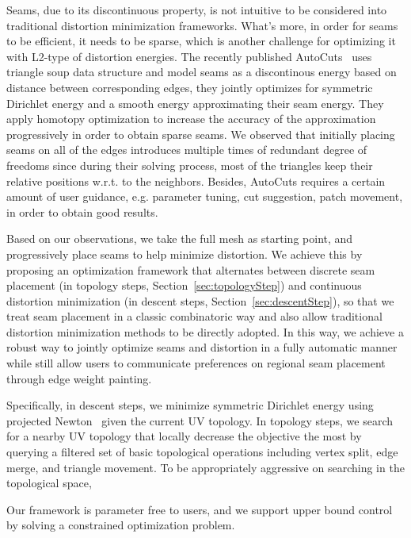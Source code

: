 Seams, due to its discontinuous property, is not intuitive to be considered into traditional distortion minimization frameworks. What's more, in order for seams to be efficient, it needs to be sparse, which is another challenge for optimizing it with L2-type of distortion energies. The recently published AutoCuts~\cite{Poranne2017Autocuts} uses triangle soup data structure and model seams as a discontinous energy based on distance between corresponding edges, they jointly optimizes for symmetric Dirichlet energy and a smooth energy approximating their seam energy. They apply homotopy optimization to increase the accuracy of the approximation progressively in order to obtain sparse seams. We observed that initially placing seams on all of the edges introduces multiple times of redundant degree of freedoms since during their solving process, most of the triangles keep their relative positions w.r.t. to the neighbors. Besides, AutoCuts requires a certain amount of user guidance, e.g. parameter tuning, cut suggestion, patch movement, in order to obtain good results.

Based on our observations, we take the full mesh as starting point, and progressively place seams to help minimize distortion. We achieve this by proposing an optimization framework that alternates between discrete seam placement (in topology steps, Section~\ref{sec:topologyStep}) and continuous distortion minimization (in descent steps, Section~\ref{sec:descentStep}), so that we treat seam placement in a classic combinatoric way and also allow traditional distortion minimization methods to be directly adopted. In this way, we achieve a robust way to jointly optimize seams and distortion in a fully automatic manner while still allow users to communicate preferences on regional seam placement through edge weight painting.

Specifically, in descent steps, we minimize symmetric Dirichlet energy using projected Newton~\cite{Teran2005Robust} given the current UV topology. In topology steps, we search for a nearby UV topology that locally decrease the objective the most by querying a filtered set of basic topological operations including vertex split, edge merge, and triangle movement. To be appropriately aggressive on searching in the topological space, 

Our framework is parameter free to users, and we support upper bound control by solving a constrained optimization problem.


